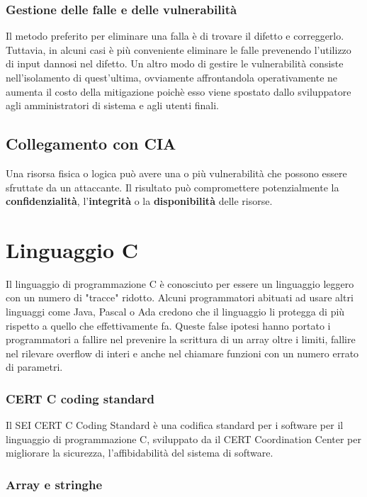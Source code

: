 \subsection{Gestione delle falle e delle vulnerabilità}
Il metodo preferito per eliminare una falla è di trovare il difetto e correggerlo. Tuttavia, in alcuni casi è più conveniente eliminare le falle prevenendo l'utilizzo di input dannosi nel difetto. Un altro modo di gestire le vulnerabilità consiste nell'isolamento di quest'ultima, ovviamente affrontandola operativamente ne aumenta il costo della mitigazione poichè esso viene spostato dallo sviluppatore agli amministratori di sistema e agli utenti finali.

\section{Collegamento con CIA}
Una risorsa fisica o logica può avere una o più vulnerabilità che possono essere sfruttate da un attaccante. Il risultato può compromettere potenzialmente la \textbf{confidenzialità}, l'\textbf{integrità} o la \textbf{disponibilità} delle risorse.

\chapter{Linguaggio C}
Il linguaggio di programmazione C è conosciuto per essere un linguaggio leggero con un numero di "tracce" ridotto.
Alcuni programmatori abituati ad usare altri linguaggi come Java, Pascal o Ada credono che il linguaggio li protegga di più rispetto a quello che effettivamente fa. Queste false ipotesi hanno portato i programmatori a fallire nel prevenire la scrittura di un array oltre i limiti, fallire nel rilevare overflow di interi e anche nel chiamare funzioni con un numero errato di parametri.

\subsection{CERT C coding standard}
Il SEI CERT C Coding Standard è una codifica standard per i software per il linguaggio di programmazione C, sviluppato da il CERT Coordination Center per migliorare la sicurezza, l'affibidabilità del sistema di software.

\subsection{Array e stringhe}
